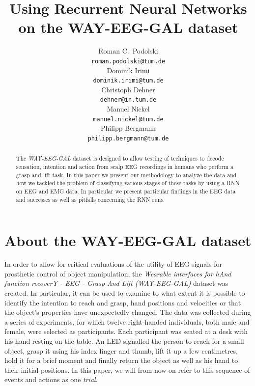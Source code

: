 \documentclass{article} %
\title{Using Recurrent Neural Networks on the WAY-EEG-GAL dataset}
\author{
Roman C.~Podolski
\\
\texttt{roman.podolski@tum.de} \\
\And
Dominik Irimi \\
\texttt{dominik.irimi@tum.de} \\
\AND
Christoph Dehner \\
\texttt{dehner@in.tum.de} \\
\And
Manuel Nickel \\
\texttt{manuel.nickel@tum.de} \\
\And
Philipp Bergmann \\
\texttt{philipp.bergmann@tum.de} \\
}
\begin{document}
\maketitle

\begin{abstract}
The \emph{WAY-EEG-GAL} dataset is designed to allow testing of techniques to decode sensation, intention and action from scalp EEG recordings in humans who perform a grasp-and-lift task. In this paper we present our methodology to analyze the data and how we tackled the problem of classifying various stages of these tasks by using a RNN on EEG and EMG data. In particular we present particular findings in the EEG data and successes as well as pitfalls concerning the RNN runs.
\end{abstract}

\section{About the WAY-EEG-GAL dataset}\label{sec:data}
In order to allow for critical evaluations of the utility of EEG signals for prosthetic control of object manipulation, the \emph{Wearable interfaces for hAnd function recoverY - EEG - Grasp And Lift (WAY-EEG-GAL)} dataset was created. In particular, it can be used to examine to what extent it is possible to identify the intention to reach and grasp, hand positions and velocities or that the object's properties have unexpectedly changed. The data was collected during a series of experiments, for which twelve right-handed individuals, both male and female, were selected as participants. Each participant was seated at a desk with his hand resting on the table. An LED signalled the person to reach for a small object, grasp it using his index finger and thumb, lift it up a few centimetres, hold it for a brief moment and finally return the object as well as his hand to their initial positions. In this paper, we will from now on refer to this sequence of events and actions as one \emph{trial}.
\end{document}
